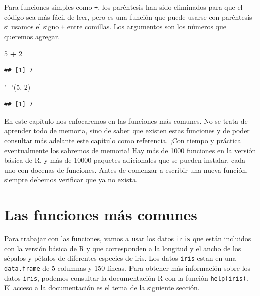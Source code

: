 \documentclass[
]{book}
\newenvironment{Shaded}{\begin{snugshade}}{\end{snugshade}}
\newcommand{\DecValTok}[1]{\textcolor[rgb]{0.00,0.00,0.81}{#1}}
\newcommand{\NormalTok}[1]{#1}
\newcommand{\OperatorTok}[1]{\textcolor[rgb]{0.81,0.36,0.00}{\textbf{#1}}}
\newcommand{\StringTok}[1]{\textcolor[rgb]{0.31,0.60,0.02}{#1}}
\begin{document}
Para funciones simples como \texttt{+}, los paréntesis han sido eliminados para que el código sea más fácil de leer, pero es una función que puede usarse con paréntesis si usamos el signo \texttt{+} entre comillas. Los argumentos son los números que queremos agregar.

\begin{Shaded}
\begin{Highlighting}[]
\DecValTok{5} \OperatorTok{+}\StringTok{ }\DecValTok{2}
\end{Highlighting}
\end{Shaded}

\begin{verbatim}
## [1] 7
\end{verbatim}

\begin{Shaded}
\begin{Highlighting}[]
\StringTok{'+'}\NormalTok{(}\DecValTok{5}\NormalTok{, }\DecValTok{2}\NormalTok{)}
\end{Highlighting}
\end{Shaded}

\begin{verbatim}
## [1] 7
\end{verbatim}

En este capítulo nos enfocaremos en las funciones más comunes. No se trata de aprender todo de memoria, sino de saber que existen estas funciones y de poder consultar más adelante este capítulo como referencia. ¡Con tiempo y práctica eventualmente los sabremos de memoria! Hay más de 1000 funciones en la versión básica de R, y más de 10000 paquetes adicionales que se pueden instalar, cada uno con docenas de funciones. Antes de comenzar a escribir una nueva función, siempre debemos verificar que ya no exista.

\hypertarget{las-funciones-muxe1s-comunes}{%
\section{Las funciones más comunes}\label{las-funciones-muxe1s-comunes}}

Para trabajar con las funciones, vamos a usar los datos \texttt{iris} que están incluidos con la versión básica de R y que corresponden a la longitud y el ancho de los sépalos y pétalos de diferentes especies de iris. Los datos \texttt{iris} estan en una \texttt{data.frame} de 5 columnas y 150 líneas. Para obtener más información sobre los datos \texttt{iris}, podemos consultar la documentación R con la función \texttt{help(iris)}. El acceso a la documentación es el tema de la siguiente sección.
\end{document}
